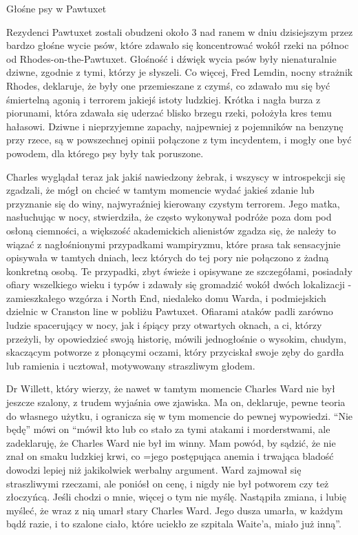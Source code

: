 \begin{displayquote}
\begin{center}
Głośne psy w Pawtuxet
\end{center}

Rezydenci Pawtuxet zostali obudzeni około 3 nad ranem w dniu dzisiejszym przez bardzo głośne wycie psów, które zdawało się koncentrować wokół rzeki na północ od Rhodes-on-the-Pawtuxet. Głośność i dźwięk wycia psów były nienaturalnie dziwne, zgodnie z tymi, którzy je słyszeli. Co więcej, Fred Lemdin, nocny strażnik Rhodes, deklaruje, że były one przemieszane z czymś, co zdawało mu się być śmiertelną agonią i terrorem jakiejś istoty ludzkiej. Krótka i nagła burza z piorunami, która zdawała się uderzać blisko brzegu rzeki, położyła kres temu hałasowi. Dziwne i nieprzyjemne zapachy, najpewniej z pojemników na benzynę przy rzece, są w powszechnej opinii połączone z tym incydentem, i mogły one być powodem, dla którego psy były tak poruszone.

\end{displayquote}

Charles wyglądał teraz jak jakiś nawiedzony żebrak, i wszyscy w introspekcji się zgadzali, że mógł on chcieć w tamtym momencie wydać jakieś zdanie lub przyznanie się do winy, najwyraźniej kierowany czystym terrorem. Jego matka, nasłuchując w nocy, stwierdziła, że często wykonywał podróże poza dom pod osłoną ciemności, a większość akademickich alienistów zgadza się, że należy to wiązać z nagłośnionymi przypadkami wampiryzmu, które prasa tak sensacyjnie opisywała w tamtych dniach, lecz których do tej pory nie połączono z żadną konkretną osobą. Te przypadki, zbyt świeże i opisywane ze szczegółami, posiadały ofiary wszelkiego wieku i typów i zdawały się gromadzić wokół dwóch lokalizacji - zamieszkałego wzgórza i North End, niedaleko domu Warda, i podmiejskich dzielnic w Cranston line w pobliżu Pawtuxet. Ofiarami ataków padli zarówno ludzie spacerujący w nocy, jak i śpiący przy otwartych oknach, a ci, którzy przeżyli, by opowiedzieć swoją historię, mówili jednogłośnie o wysokim, chudym, skaczącym potworze z płonącymi oczami, który przyciskał swoje zęby do gardła lub ramienia i ucztował, motywowany straszliwym głodem.  

Dr Willett, który wierzy, że nawet w tamtym momencie Charles Ward nie był jeszcze szalony, z trudem wyjaśnia owe zjawiska. Ma on, deklaruje, pewne teoria do własnego użytku, i ogranicza się w tym momencie do pewnej wypowiedzi. ``Nie będę'' mówi on ``mówił kto lub co stało za tymi atakami i morderstwami, ale zadeklaruję, że Charles Ward nie był im winny. Mam powód, by sądzić, że nie znał on smaku ludzkiej krwi, co =jego postępująca anemia i trwająca bladość dowodzi lepiej niż jakikolwiek werbalny argument. Ward zajmował się straszliwymi rzeczami, ale poniósł on cenę, i nigdy nie był potworem czy też złoczyńcą. Jeśli chodzi o mnie, więcej o tym nie myślę. Nastąpiła zmiana, i lubię myśleć, że wraz z nią umarł stary Charles Ward. Jego dusza umarła, w każdym bądź razie, i to szalone ciało, które uciekło ze szpitala Waite'a, miało już inną''.

